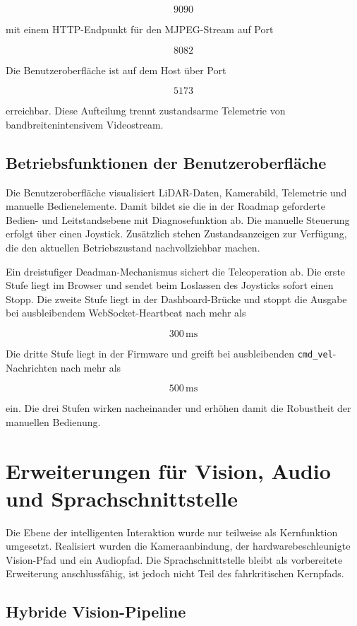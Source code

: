 $$9090$$

mit einem HTTP-Endpunkt für den MJPEG-Stream auf Port

$$8082$$

Die Benutzeroberfläche ist auf dem Host über Port

$$5173$$

erreichbar. Diese Aufteilung trennt zustandsarme Telemetrie von bandbreitenintensivem Videostream.

\subsection{Betriebsfunktionen der Benutzeroberfläche}

Die Benutzeroberfläche visualisiert LiDAR-Daten, Kamerabild, Telemetrie und manuelle Bedienelemente. Damit bildet sie die in der Roadmap geforderte Bedien- und Leitstandsebene mit Diagnosefunktion ab. Die manuelle Steuerung erfolgt über einen Joystick. Zusätzlich stehen Zustandsanzeigen zur Verfügung, die den aktuellen Betriebszustand nachvollziehbar machen.

Ein dreistufiger Deadman-Mechanismus sichert die Teleoperation ab. Die erste Stufe liegt im Browser und sendet beim Loslassen des Joysticks sofort einen Stopp. Die zweite Stufe liegt in der Dashboard-Brücke und stoppt die Ausgabe bei ausbleibendem WebSocket-Heartbeat nach mehr als

$$300\,\mathrm{ms}$$

Die dritte Stufe liegt in der Firmware und greift bei ausbleibenden \texttt{cmd\_vel}-Nachrichten nach mehr als

$$500\,\mathrm{ms}$$

ein. Die drei Stufen wirken nacheinander und erhöhen damit die Robustheit der manuellen Bedienung.

\section{Erweiterungen für Vision, Audio und Sprachschnittstelle}

Die Ebene der intelligenten Interaktion wurde nur teilweise als Kernfunktion umgesetzt. Realisiert wurden die Kameraanbindung, der hardwarebeschleunigte Vision-Pfad und ein Audiopfad. Die Sprachschnittstelle bleibt als vorbereitete Erweiterung anschlussfähig, ist jedoch nicht Teil des fahrkritischen Kernpfads.

\subsection{Hybride Vision-Pipeline}

